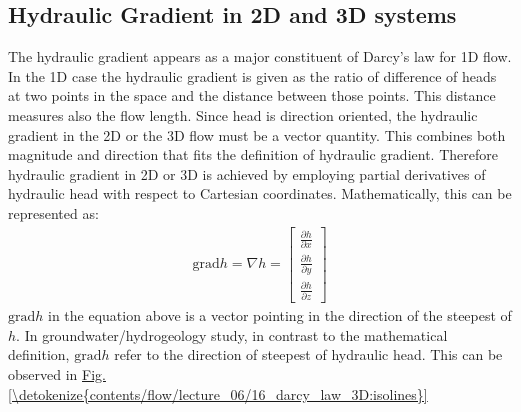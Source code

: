 \documentclass[letterpaper,10pt,english]{sphinxmanual}
\begin{document}
\subsection{Hydraulic Gradient in 2D and 3D systems}
\label{\detokenize{contents/flow/lecture_06/16_darcy_law_3D:hydraulic-gradient-in-2d-and-3d-systems}}
The hydraulic gradient appears as a major constituent of Darcy’s law for 1D flow. In the 1D case the hydraulic gradient is given as the ratio of difference of heads at two points in the space and the distance between those points. This distance measures also the flow length. Since head is direction oriented, the hydraulic gradient in the 2D or the 3D flow must be a vector quantity. This combines both magnitude and direction that fits the definition of hydraulic gradient. Therefore hydraulic gradient in 2D or 3D is achieved by employing partial derivatives of hydraulic head with respect to Cartesian coordinates. Mathematically, this can be represented as:
\begin{equation*}
\begin{split}
\text{grad}h=\nabla h = \begin{bmatrix}
\frac{\partial h}{\partial x}
\\ 
\frac{\partial h}{\partial y}
\\ 
\frac{\partial h}{\partial z}
\end{bmatrix}   
\end{split}
\end{equation*}
\(\text{grad}h\) in the equation above is a vector pointing in the direction of the steepest  of \(h\). In groundwater/hydrogeology study, in contrast to the mathematical definition, \(\text{grad}h\) refer to the direction of steepest  of hydraulic head. This can be observed in \hyperref[\detokenize{contents/flow/lecture_06/16_darcy_law_3D:isolines}]{Fig.\@ \ref{\detokenize{contents/flow/lecture_06/16_darcy_law_3D:isolines}}}
\end{document}
